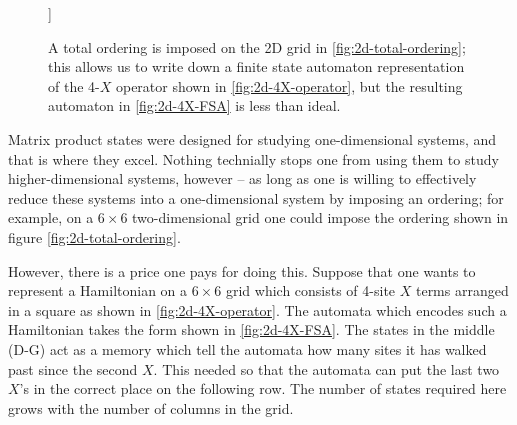 \documentclass[12pt]{amsbook}
\theoremstyle{plain}
\theoremstyle{definition}
\theoremstyle{remark}
\begin{document}
\begin{figure}
]{}
\caption{A total ordering is imposed on the 2D grid in \ref{fig:2d-total-ordering};  this allows us to write down a finite state automaton representation of the 4-$X$ operator shown in \ref{fig:2d-4X-operator}, but the resulting automaton in \ref{fig:2d-4X-FSA} is less than ideal.}
\end{figure}

Matrix product states were designed for studying one-dimensional systems, and that is where they excel.  Nothing technially stops one from using them to study higher-dimensional systems, however -- as long as one is willing to effectively reduce these systems into a one-dimensional system by imposing an ordering; for example, on a $6\times 6$ two-dimensional grid one could impose the ordering shown in figure \ref{fig:2d-total-ordering}.

However, there is a price one pays for doing this.  Suppose that one wants to represent a Hamiltonian on a $6\times 6$ grid which consists of 4-site $X$ terms arranged in a square as shown in \ref{fig:2d-4X-operator}. The automata which encodes such a Hamiltonian takes the form shown in \ref{fig:2d-4X-FSA}.  The states in the middle (D-G) act as a memory which tell the automata how many sites it has walked past since the second $X$.  This needed so that the automata can put the last two $X$'s in the correct place on the following row.  The number of states required here grows with the number of columns in the grid.
\end{document}
